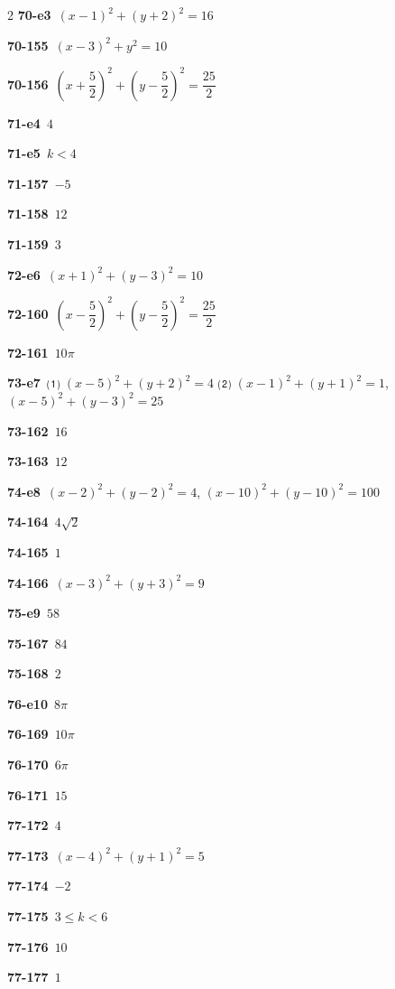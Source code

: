 \documentclass[10pt,a4paper]{article}
\begin{document}
\begin{multicols}{2}
\noindent\textbf{70-e3}\ $(x-1)^2+(y+2)^2=16$\par
\noindent\textbf{70-155}\ $(x-3)^2+y^2=10$\par
\noindent\textbf{70-156}\ $\left(x+\dfrac{5}{2}\right)^2+\left(y-\dfrac{5}{2}\right)^2=\dfrac{25}{2}$\par
\noindent\textbf{71-e4}\ $4$\par
\noindent\textbf{71-e5}\ $k<4$\par
\noindent\textbf{71-157}\ $-5$\par
\noindent\textbf{71-158}\ $12$\par
\noindent\textbf{71-159}\ $3$\par
\noindent\textbf{72-e6}\ $(x+1)^2+(y-3)^2=10$\par
\noindent\textbf{72-160}\ $\left(x-\dfrac{5}{2}\right)^2+\left(y-\dfrac{5}{2}\right)^2=\dfrac{25}{2}$\par
\noindent\textbf{72-161}\ $10\pi$\par
\noindent\textbf{73-e7}\ ⑴ $(x-5)^2+(y+2)^2=4$ ⑵ $(x-1)^2+(y+1)^2=1$, $(x-5)^2+(y-3)^2=25$\par
\noindent\textbf{73-162}\ $16$\par
\noindent\textbf{73-163}\ $12$\par
\noindent\textbf{74-e8}\ $(x-2)^2+(y-2)^2=4$, $(x-10)^2+(y-10)^2=100$\par
\noindent\textbf{74-164}\ $4\sqrt{2}$\par
\noindent\textbf{74-165}\ $1$\par
\noindent\textbf{74-166}\ $(x-3)^2+(y+3)^2=9$\par
\noindent\textbf{75-e9}\ $58$\par
\noindent\textbf{75-167}\ $84$\par
\noindent\textbf{75-168}\ $2$\par
\noindent\textbf{76-e10}\ $8\pi$\par
\noindent\textbf{76-169}\ $10\pi$\par
\noindent\textbf{76-170}\ $6\pi$\par
\noindent\textbf{76-171}\ $15$\par
\noindent\textbf{77-172}\ $4$\par
\noindent\textbf{77-173}\ $(x-4)^2+(y+1)^2=5$\par
\noindent\textbf{77-174}\ $-2$\par
\noindent\textbf{77-175}\ $3\le k<6$\par
\noindent\textbf{77-176}\ $10$\par
\noindent\textbf{77-177}\ $1$\par

\end{multicols}
\end{document}
